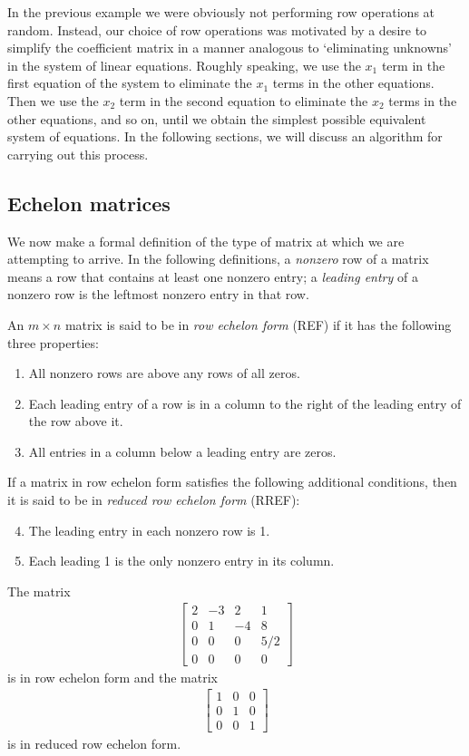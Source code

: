 \documentclass[12pt,letterpaper,reqno]{article}
\numberwithin{equation}{section}
\newcommand{\ti}[1]{\textit{#1}}
\begin{document}
In the previous example we were obviously not performing row operations at random. Instead, our choice of row operations was motivated by a desire to simplify the coefficient matrix in a manner analogous to `eliminating unknowns' in the system of linear equations. Roughly speaking, we use the $x_1$ term in the first equation of the system to eliminate the $x_1$ terms in the other equations. Then we use the $x_2$ term in the second equation to eliminate the $x_2$ terms in the other equations, and so on, until we obtain the simplest possible equivalent system of equations. In the following sections, we will discuss an algorithm for carrying out this process.

\subsection{Echelon matrices}
We now make a formal definition of the type of matrix at which we are attempting to arrive. In the following definitions, a \ti{nonzero} row of a matrix means a row that contains at least one nonzero entry; a \ti{leading entry} of a nonzero row is the leftmost nonzero entry in that row.
\begin{defn}
	An $m \times n$ matrix is said to be in \ti{row echelon form} (REF) if it has the following three properties:
	\begin{enumerate}
		\item All nonzero rows are above any rows of all zeros.
		\item Each leading entry of a row is in a column to the right of the leading entry of the row above it.
		\item All entries in a column below a leading entry are zeros.
	\end{enumerate}
If a matrix in row echelon form satisfies the following additional conditions, then it is said to be in \ti{reduced row echelon form} (RREF):
\begin{enumerate}
\setcounter{enumi}{3}
	\item The leading entry in each nonzero row is 1.
	\item Each leading 1 is the only nonzero entry in its column.
\end{enumerate}
\end{defn}

\begin{example}
The matrix
\begin{align*}
	\begin{bmatrix}
	2&-3&2&1 \\
	0&1&-4&8 \\
	0&0&0&5/2 \\
	0&0&0&0
\end{bmatrix}
\end{align*}
is in row echelon form and the matrix 
\begin{align*}
	\begin{bmatrix}
	1&0&0 \\ 0 & 1 & 0 \\ 0&0&1
\end{bmatrix}
\end{align*}
is in reduced row echelon form.	
\end{example}
\end{document}
